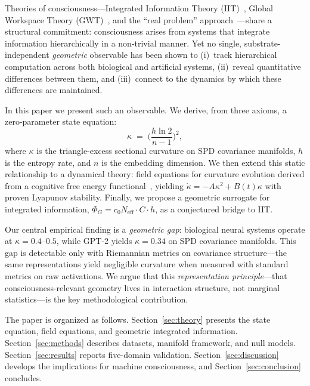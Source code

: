 \documentclass[letterpaper]{article}
\begin{document}
Theories of consciousness---Integrated Information
Theory (IIT)~\citep{tononi2004}, Global Workspace
Theory (GWT)~\citep{baars2005}, and the ``real problem''
approach~\citep{seth2022}---share a structural
commitment: consciousness arises from systems that
integrate information hierarchically in a non-trivial
manner.
Yet no single, substrate-independent \emph{geometric}
observable has been shown to (i)~track hierarchical
computation across both biological and artificial
systems, (ii)~reveal quantitative differences between
them, and (iii)~connect to the dynamics by which
these differences are maintained.

In this paper we present such an observable.
We derive, from three axioms, a zero-parameter state
equation:
\begin{equation}\label{eq:state}
  \kappa \;=\; \biggl(\frac{h\ln 2}{n-1}\biggr)^{\!2},
\end{equation}
where $\kappa$ is the triangle-excess sectional curvature
on SPD covariance manifolds, $h$ is the entropy rate,
and $n$ is the embedding dimension.
We then extend this static relationship to a dynamical
theory: field equations for curvature evolution derived
from a cognitive free energy
functional~\citep{perelman2002}, yielding
$\dot{\kappa}=-A\kappa^2+B(t)\kappa$ with proven
Lyapunov stability.
Finally, we propose a geometric surrogate for
integrated information,
$\Phi_G = c_0 N_\mathrm{eff} \cdot C \cdot h$,
as a conjectured bridge to IIT.

Our central empirical finding is a \emph{geometric gap}:
biological neural systems operate at
$\kappa=0.4$--$0.5$, while GPT-2 yields
$\kappa=0.34$ on SPD covariance manifolds.
This gap is detectable only with Riemannian
metrics on covariance structure---the same
representations yield negligible curvature
when measured with standard metrics on raw
activations.
We argue that this \emph{representation principle}---that
consciousness-relevant geometry lives in interaction
structure, not marginal statistics---is the key
methodological contribution.

The paper is organized as follows.
Section~\ref{sec:theory} presents the state equation,
field equations, and geometric integrated information.
Section~\ref{sec:methods} describes datasets, manifold
framework, and null models.
Section~\ref{sec:results} reports five-domain validation.
Section~\ref{sec:discussion} develops the implications
for machine consciousness, and
Section~\ref{sec:conclusion} concludes.

\end{document}
